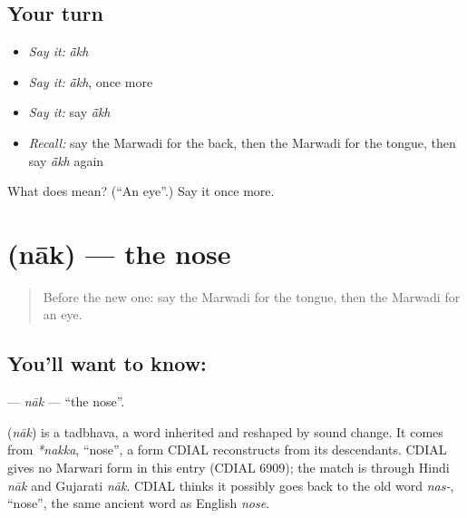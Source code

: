 \subsection*{Your turn}
\begin{itemize}
\raggedright
  \item \emph{Say it:} \emph{ā̃kh}
  \item \emph{Say it:} \emph{ā̃kh}, once more
  \item \emph{Say it:} say \emph{ā̃kh}
  \item \emph{Recall:} say the Marwadi for the back, then the Marwadi for the tongue, then say \emph{ā̃kh} again
\end{itemize}

\begin{tcolorbox}[breakable,colback=teal!4,colframe=teal!35!black,title={Before you move on}]
What does  mean? (\textquotedblleft{}An eye\textquotedblright{}.) Say it once more.
\end{tcolorbox}
\section[\texorpdfstring{\mw{नाक} (nāk)}{नाक (nāk)}]{ (nāk) — the nose}

\label{lesson:MW-C46-nak}



\begin{quote}
Before the new one: say the Marwadi for the tongue, then the Marwadi for an eye.
\end{quote}

\subsection*{You'll want to know: }
\textbf{} — \emph{nāk} — \textquotedblleft{}the nose\textquotedblright{}.

\begin{cousinweb}
\textbf{} (\emph{nāk}) is a tadbhava, a word inherited and reshaped by sound change. It comes from \emph{*nakka}, \textquotedblleft{}nose\textquotedblright{}, a form CDIAL reconstructs from its descendants. CDIAL gives no Marwari form in this entry (CDIAL 6909); the match is through Hindi \emph{nāk} and Gujarati \emph{nāk}. CDIAL thinks it possibly goes back to the old word \emph{nas-}, \textquotedblleft{}nose\textquotedblright{}, the same ancient word as English \emph{nose}.
\end{cousinweb}

